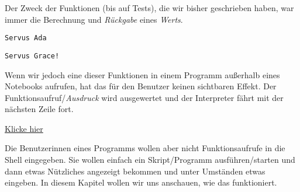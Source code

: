 Der Zweck der Funktionen (bis auf Tests), die wir bisher geschrieben
haben, war immer die Berechnung und \emph{Rückgabe} eines \emph{Werts}.

\label{c6bb0c21-d429-4607-bd62-94a626825738}
\begin{Shaded}
\begin{Highlighting}[]
 \OperatorTok{(}\OperatorTok{:} \OperatorTok{):}  \OperatorTok{\{}
      \OperatorTok{+}
\OperatorTok{\}} 
\end{Highlighting}
\end{Shaded}

\label{80f0e4a7-fd42-49fa-a595-fe53ae6a807d}
\begin{Shaded}
\begin{Highlighting}[]
\OperatorTok{(}\OperatorTok{)}
\end{Highlighting}
\end{Shaded}

\begin{verbatim}
Servus Ada
\end{verbatim}

\label{5f1dc148}
\begin{Shaded}
\begin{Highlighting}[]
\OperatorTok{(}\OperatorTok{)} \OperatorTok{+} 
\end{Highlighting}
\end{Shaded}

\begin{verbatim}
Servus Grace!
\end{verbatim}

\label{488f80c3-82d6-4ae4-b393-ff0d5cca2d4a}
Wenn wir jedoch eine dieser Funktionen in einem Programm außerhalb eines
Notebooks aufrufen, hat das für den Benutzer keinen sichtbaren Effekt.
Der Funktionsaufruf/\emph{Ausdruck} wird ausgewertet und der Interpreter
fährt mit der nächsten Zeile fort.

\label{2a4f7b16}
\href{https://pl.kotl.in/aydBQ-O0G}{Klicke hier}

\label{fad3c21c30dab5de}
Die Benutzerinnen eines Programms wollen aber nicht Funktionsaufrufe in
die Shell eingegeben. Sie wollen einfach ein Skript/Programm
ausführen/starten und dann etwas Nützliches angezeigt bekommen und unter
Umständen etwas eingeben. In diesem Kapitel wollen wir uns anschauen,
wie das funktioniert.

